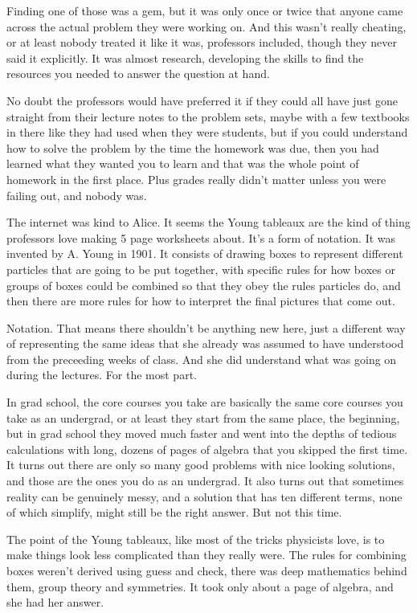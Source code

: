 Finding one of those was a gem, but it was only once or twice that anyone came across the actual problem they were working on. And this wasn't really cheating, or at least nobody treated it like it was, professors included, though they never said it explicitly. It was almost research, developing the skills to find the resources you needed to answer the question at hand. 

No doubt the professors would have preferred it if they could all have just gone straight from their lecture notes to the problem sets, maybe with a few textbooks in there like they had used when they were students, but if you could understand how to solve the problem by the time the homework was due, then you had learned what they wanted you to learn and that was the whole point of homework in the first place. Plus grades really didn't matter unless you were failing out, and nobody was.

\mypause
 
The internet was kind to Alice. It seems the Young tableaux are the kind of thing professors love making 5 page worksheets about. It's a form of notation. It was invented by A. Young in 1901. It consists of drawing boxes to represent different particles that are going to be put together, with specific rules for how boxes or groups of boxes could be combined so that they obey the rules particles do, and then there are more rules for how to interpret the final pictures that come out. 

Notation. That means there shouldn't be anything new here, just a different way of representing the same ideas that she already was assumed to have understood from the preceeding weeks of class. And she did understand what was going on during the lectures. For the most part. 

In grad school, the core courses you take are basically the same core courses you take as an undergrad, or at least they start from the same place, the beginning, but in grad school they moved much faster and went into the depths of tedious calculations with long, dozens of pages of algebra that you skipped the first time. It turns out there are only so many good problems with nice looking solutions, and those are the ones you do as an undergrad. It also turns out that sometimes reality can be genuinely messy, and a solution that has ten different terms, none of which simplify, might still be the right answer. But not this time.

The point of the Young tableaux, like most of the tricks physicists love, is to make things look less complicated than they really were. The rules for combining boxes weren't derived using guess and check, there was deep mathematics behind them, group theory and symmetries. It took only about a page of algebra, and she had her answer.

